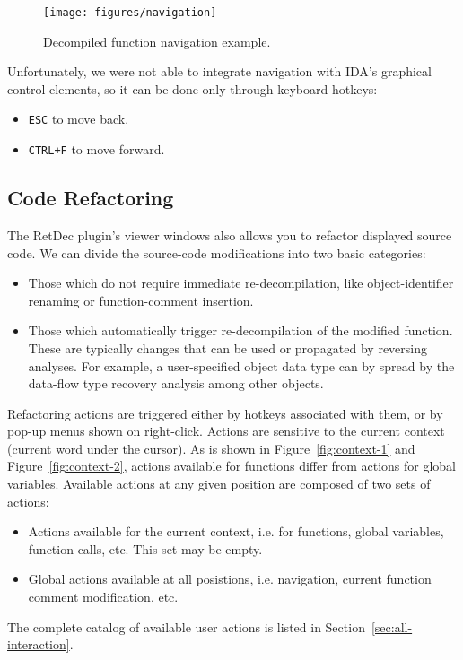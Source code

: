 \documentclass[pdftex, a4paper,12pt, oneside, svgnames]{article}
\begin{document}
\begin{figure}[!ht]
	\centering
	\texttt{[image: figures/navigation]}
	\caption{Decompiled function navigation example.}
	\label{fig:navigation}
\end{figure}

Unfortunately, we were not able to integrate navigation with IDA's graphical control elements, so it can be done only through keyboard hotkeys:
\begin{itemize}
	\item \texttt{ESC} to move back.
	\item \texttt{CTRL+F} to move forward.
\end{itemize}

\subsection{Code Refactoring}
\label{sec:refactoring}
The RetDec plugin's viewer windows also allows you to refactor displayed source code. We can divide the source-code modifications into two basic categories:
\begin{itemize}
	\item Those which do not require immediate re-decompilation, like object-identifier renaming or function-comment insertion.
	\item Those which automatically trigger re-decompilation of the modified function. These are typically changes that can be used or propagated by reversing analyses. For example, a user-specified object data type can by spread by the data-flow type recovery analysis among other objects.
\end{itemize}

Refactoring actions are triggered either by hotkeys associated with them, or by pop-up menus shown on right-click. Actions are sensitive to the current context (current word under the cursor). As is shown in Figure~\ref{fig:context-1} and Figure~\ref{fig:context-2}, actions available for functions differ from actions for global variables. Available actions at any given position are composed of two sets of actions:
\begin{itemize}
	\item Actions available for the current context, i.e. for functions, global variables, function calls, etc. This set may be empty.
	\item Global actions available at all posistions, i.e. navigation, current function comment modification, etc.
\end{itemize}
The complete catalog of available user actions is listed in Section~\ref{sec:all-interaction}.
\end{document}
